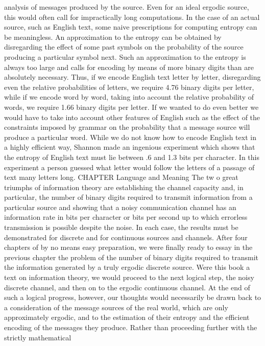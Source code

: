{{{analysis of messages produced by the source. Even for an ideal
ergodic source, this would often call for impractically long computations.
In the case of an actual source, such as English text, some
naive prescriptions for computing entropy can be meaningless.
An approximation to the entropy can be obtained by disregarding
the effect of some past symbols on the probability of the source
producing a particular symbol next. Such an approximation to the
entropy is always too large and calls for encoding by means of more
binary digits than are absolutely necessary. Thus, if we encode
English text letter by letter, disregarding even the relative probabilities
of letters, we require 4.76 binary digits per letter, while if
we encode word by word, taking into account the relative probability
of words, we require 1.66 binary digits per letter.
If we wanted to do even better we would have to take into
account other features of English such as the effect of the constraints
imposed by grammar on the probability that a message
source will produce a particular word.
While we do not know how to encode English text in a highly
efficient way, Shannon made an ingenious experiment which shows
that the entropy of English text must lie between .6 and 1.3 bits
per character. In this experiment a person guessed what letter
would follow the letters of a passage of text many letters long.
CHAPTER Language and
Meaning
The tw o great triumphs of information theory are establishing
the channel capacity and, in particular, the number of binary digits
required to transmit information from a particular source and
showing that a noisy communication channel has an information
rate in bits per character or bits per second up to which errorless
transmission is possible despite the noise. In each case, the results
must be demonstrated for discrete and for continuous sources and
channels.
After four chapters of by no means easy preparation, we were
finally ready to essay in the previous chapter the problem of the
number of binary digits required to transmit the information generated
by a truly ergodic discrete source. Were this book a text on
information theory, we would proceed to the next logical step, the
noisy discrete channel, and then on to the ergodic continuous
channel.
At the end of such a logical progress, however, our thoughts
would necessarily be drawn back to a consideration of the message
sources of the real world, which are only approximately ergodic,
and to the estimation of their entropy and the efficient encoding
of the messages they produce.
Rather than proceeding further with the strictly mathematical
}}}
